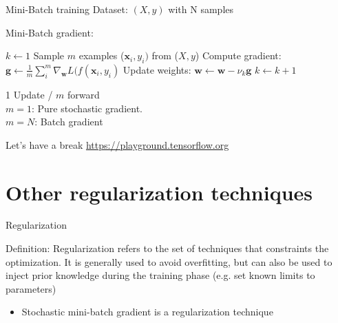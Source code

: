 \documentclass[handout]{beamer}
\begin{document}
\begin{frame}{Mini-Batch training}
Dataset: $(X,y)$ with N samples
\begin{footnotesize}
\begin{block}{Mini-Batch gradient:}\end{block}

    \begin{algorithmic}
    \State $k \leftarrow 1$
    \State Sample $m$ examples ($\mathbf{x}_i,y_i)$ from ($X,y$)
    \State Compute gradient: $\mathbf{g} \leftarrow \frac{1}{m}\sum_i^m\nabla_\mathbf{w}L(f(\mathbf{x}_i,y_i)$
    \State Update weights: $\mathbf{w} \leftarrow \mathbf{w} - \nu_k\mathbf{g}$
    \State $k \leftarrow k + 1$
    \EndWhile 
    
    \end{algorithmic}
    \end{footnotesize}
    \pause
        \alert{1 Update / $m$ forward}\\
        $m=1$: Pure stochastic gradient.\\
        $m=N$: Batch gradient

\end{frame}


\begin{frame}{Let's have a break}
\url{https://playground.tensorflow.org}
\end{frame}



\section{Other regularization techniques}
\begin{frame}{Regularization}
\begin{block}{Definition:}
\alert{Regularization} refers to the \alert{set of techniques} that \alert{constraints} the optimization. It is generally used to \alert{avoid overfitting}, but can also be used to inject prior knowledge during the training phase (e.g. set known limits to parameters)
\end{block}
\pause
\begin{itemize}
    \item Stochastic mini-batch gradient is a regularization technique
\end{itemize}

\end{frame}
\end{document}

